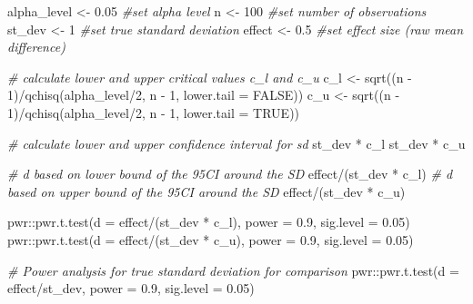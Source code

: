 \documentclass[
  oneside]{book}
\newenvironment{Shaded}{\begin{snugshade}}{\end{snugshade}}
\newcommand{\AttributeTok}[1]{\textcolor[rgb]{0.77,0.63,0.00}{#1}}
\newcommand{\CommentTok}[1]{\textcolor[rgb]{0.56,0.35,0.01}{\textit{#1}}}
\newcommand{\ConstantTok}[1]{\textcolor[rgb]{0.00,0.00,0.00}{#1}}
\newcommand{\DecValTok}[1]{\textcolor[rgb]{0.00,0.00,0.81}{#1}}
\newcommand{\FloatTok}[1]{\textcolor[rgb]{0.00,0.00,0.81}{#1}}
\newcommand{\FunctionTok}[1]{\textcolor[rgb]{0.00,0.00,0.00}{#1}}
\newcommand{\NormalTok}[1]{#1}
\newcommand{\OtherTok}[1]{\textcolor[rgb]{0.56,0.35,0.01}{#1}}
\newcommand{\SpecialCharTok}[1]{\textcolor[rgb]{0.00,0.00,0.00}{#1}}
\begin{document}
\begin{Shaded}
\begin{Highlighting}[]
\NormalTok{alpha\_level }\OtherTok{\textless{}{-}} \FloatTok{0.05} \CommentTok{\#set alpha level}
\NormalTok{n }\OtherTok{\textless{}{-}} \DecValTok{100} \CommentTok{\#set number of observations}
\NormalTok{st\_dev }\OtherTok{\textless{}{-}} \DecValTok{1} \CommentTok{\#set true standard deviation}
\NormalTok{effect }\OtherTok{\textless{}{-}} \FloatTok{0.5} \CommentTok{\#set effect size (raw mean difference)}

\CommentTok{\# calculate lower and upper critical values c\_l and c\_u}
\NormalTok{c\_l }\OtherTok{\textless{}{-}} \FunctionTok{sqrt}\NormalTok{((n }\SpecialCharTok{{-}} \DecValTok{1}\NormalTok{)}\SpecialCharTok{/}\FunctionTok{qchisq}\NormalTok{(alpha\_level}\SpecialCharTok{/}\DecValTok{2}\NormalTok{, n }\SpecialCharTok{{-}} \DecValTok{1}\NormalTok{, }\AttributeTok{lower.tail =} \ConstantTok{FALSE}\NormalTok{))}
\NormalTok{c\_u }\OtherTok{\textless{}{-}} \FunctionTok{sqrt}\NormalTok{((n }\SpecialCharTok{{-}} \DecValTok{1}\NormalTok{)}\SpecialCharTok{/}\FunctionTok{qchisq}\NormalTok{(alpha\_level}\SpecialCharTok{/}\DecValTok{2}\NormalTok{, n }\SpecialCharTok{{-}} \DecValTok{1}\NormalTok{, }\AttributeTok{lower.tail =} \ConstantTok{TRUE}\NormalTok{))}

\CommentTok{\# calculate lower and upper confidence interval for sd}
\NormalTok{st\_dev }\SpecialCharTok{*}\NormalTok{ c\_l}
\NormalTok{st\_dev }\SpecialCharTok{*}\NormalTok{ c\_u}

\CommentTok{\# d based on lower bound of the 95CI around the SD}
\NormalTok{effect}\SpecialCharTok{/}\NormalTok{(st\_dev }\SpecialCharTok{*}\NormalTok{ c\_l)}
\CommentTok{\# d based on upper bound of the 95CI around the SD}
\NormalTok{effect}\SpecialCharTok{/}\NormalTok{(st\_dev }\SpecialCharTok{*}\NormalTok{ c\_u)}

\NormalTok{pwr}\SpecialCharTok{::}\FunctionTok{pwr.t.test}\NormalTok{(}\AttributeTok{d =}\NormalTok{ effect}\SpecialCharTok{/}\NormalTok{(st\_dev }\SpecialCharTok{*}\NormalTok{ c\_l), }\AttributeTok{power =} \FloatTok{0.9}\NormalTok{, }\AttributeTok{sig.level =} \FloatTok{0.05}\NormalTok{)}
\NormalTok{pwr}\SpecialCharTok{::}\FunctionTok{pwr.t.test}\NormalTok{(}\AttributeTok{d =}\NormalTok{ effect}\SpecialCharTok{/}\NormalTok{(st\_dev }\SpecialCharTok{*}\NormalTok{ c\_u), }\AttributeTok{power =} \FloatTok{0.9}\NormalTok{, }\AttributeTok{sig.level =} \FloatTok{0.05}\NormalTok{)}

\CommentTok{\# Power analysis for true standard deviation for comparison}
\NormalTok{pwr}\SpecialCharTok{::}\FunctionTok{pwr.t.test}\NormalTok{(}\AttributeTok{d =}\NormalTok{ effect}\SpecialCharTok{/}\NormalTok{st\_dev, }\AttributeTok{power =} \FloatTok{0.9}\NormalTok{, }\AttributeTok{sig.level =} \FloatTok{0.05}\NormalTok{)}
\end{Highlighting}
\end{Shaded}
\end{document}

